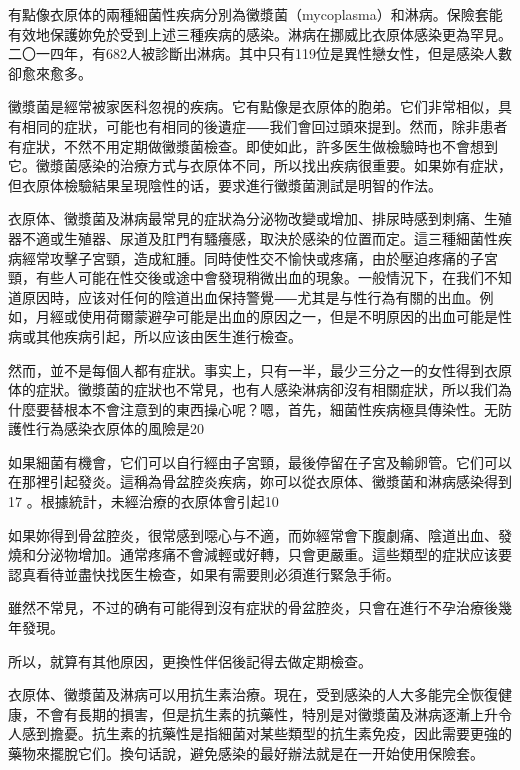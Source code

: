 \documentclass[12pt,UTF8]{ctexbook}
\begin{document}
有點像衣原体的兩種細菌性疾病分別為黴漿菌（mycoplasma）和淋病。保險套能有效地保護妳免於受到上述三種疾病的感染。淋病在挪威比衣原体感染更為罕見。二〇一四年，有682人被診斷出淋病。其中只有119位是異性戀女性，但是感染人數卻愈來愈多。

黴漿菌是經常被家医科忽視的疾病。它有點像是衣原体的胞弟。它们非常相似，具有相同的症狀，可能也有相同的後遺症⸺我们會回过頭來提到。然而，除非患者有症狀，不然不用定期做黴漿菌檢查。即使如此，許多医生做檢驗時也不會想到它。黴漿菌感染的治療方式与衣原体不同，所以找出疾病很重要。如果妳有症狀，但衣原体檢驗結果呈現陰性的话，要求進行黴漿菌測試是明智的作法。

衣原体、黴漿菌及淋病最常見的症狀為分泌物改變或增加、排尿時感到刺痛、生殖器不適或生殖器、尿道及肛門有騷癢感，取決於感染的位置而定。這三種細菌性疾病經常攻擊子宮頸，造成紅腫。同時使性交不愉快或疼痛，由於壓迫疼痛的子宮頸，有些人可能在性交後或途中會發現稍微出血的現象。一般情況下，在我们不知道原因時，应该对任何的陰道出血保持警覺⸺尤其是与性行為有關的出血。例如，月經或使用荷爾蒙避孕可能是出血的原因之一，但是不明原因的出血可能是性病或其他疾病引起，所以应该由医生進行檢查。

然而，並不是每個人都有症狀。事实上，只有一半，最少三分之一的女性得到衣原体的症狀。黴漿菌的症狀也不常見，也有人感染淋病卻沒有相關症狀，所以我们為什麼要替根本不會注意到的東西操心呢？嗯，首先，細菌性疾病極具傳染性。无防護性行為感染衣原体的風險是20%

如果細菌有機會，它们可以自行經由子宮頸，最後停留在子宮及輸卵管。它们可以在那裡引起發炎。這稱為骨盆腔炎疾病，妳可以從衣原体、黴漿菌和淋病感染得到17 。根據統計，未經治療的衣原体會引起10%

如果妳得到骨盆腔炎，很常感到噁心与不適，而妳經常會下腹劇痛、陰道出血、發燒和分泌物增加。通常疼痛不會減輕或好轉，只會更嚴重。這些類型的症狀应该要認真看待並盡快找医生檢查，如果有需要則必須進行緊急手術。

雖然不常見，不过的确有可能得到沒有症狀的骨盆腔炎，只會在進行不孕治療後幾年發現。

所以，就算有其他原因，更換性伴侶後記得去做定期檢查。

衣原体、黴漿菌及淋病可以用抗生素治療。現在，受到感染的人大多能完全恢復健康，不會有長期的損害，但是抗生素的抗藥性，特別是对黴漿菌及淋病逐漸上升令人感到擔憂。抗生素的抗藥性是指細菌对某些類型的抗生素免疫，因此需要更強的藥物來擺脫它们。換句话說，避免感染的最好辦法就是在一开始使用保險套。
\end{document}
